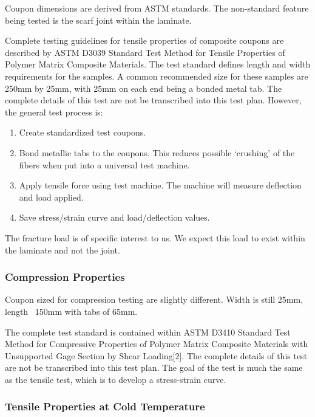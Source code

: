 Coupon dimensions are derived from ASTM standards. The non-standard feature being tested is the
scarf joint within the laminate.

Complete testing guidelines for tensile properties of composite coupons are described by ASTM
D3039 Standard Test Method for Tensile Properties of Polymer Matrix Composite Materials. The test
standard defines length and width requirements for the samples. A common recommended size for
these samples are 250mm by 25mm, with 25mm on each end being a bonded metal tab. The
complete details of this test are not be transcribed into this test plan. However, the general test
process is:

\begin{enumerate}
    \item Create standardized test coupons.
    \item Bond metallic tabs to the coupons. This reduces possible ‘crushing’ of the fibers when put
into a universal test machine.
    \item Apply tensile force using test machine. The machine will measure deflection and load applied.
    \item Save stress/strain curve and load/deflection values.
\end{enumerate}

The fracture load is of specific interest to us. We expect this load to exist within the laminate and not the joint.

\subsubsection{Compression Properties}
\label{sec:cryost-proto-scarfcomp}

Coupon sized for compression testing are slightly different. Width is still 25mm, length ~150mm with
tabs of 65mm.

The complete test standard is contained within ASTM D3410 Standard Test Method for Compressive
Properties of Polymer Matrix Composite Materials with Unsupported Gage Section by Shear
Loading[2]. The complete details of this test are not be transcribed into this test plan. The goal of the test is much the same as the tensile test, which is to develop a stress-strain curve.

\subsubsection{Tensile Properties at Cold Temperature}
\label{sec:cryost-proto-scarftencold}

